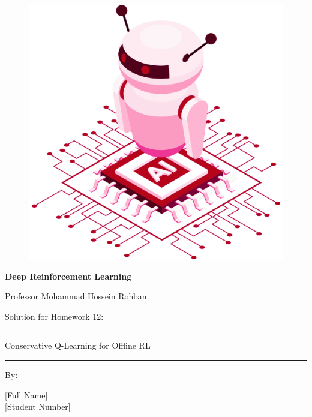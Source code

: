 \documentclass[12pt]{article}
\begin{document}
\thispagestyle{plain}

\begin{center}

\vspace*{-1.5cm}
\begin{figure}[!h]
    \centering
    \includegraphics[width=0.7\linewidth]{figs/cover-std.png}
\end{figure}

{

{\color{DarkBlue} {\fontsize{30}{50} \textbf{
Deep Reinforcement Learning
}}}

{\color{DarkBlue} {\Large
Professor Mohammad Hossein Rohban
}}
}


\vspace{20pt}

{


{\color{RedOrange}
{\Large
Solution for Homework 12:
}\\
}
{\color{BrickRed}
\rule{12cm}{0.5pt}

{\Huge

Conservative Q-Learning for Offline RL

}
\rule{12cm}{0.5pt}
}

\vspace{10pt}

{\color{RoyalPurple} { \small By:} } \\
\vspace{10pt}

{\color{Blue} { \LARGE [Full Name] } } \\
\vspace{5pt}
{\color{RoyalBlue} { \Large [Student Number] } }


}
\end{center}
\end{document}

